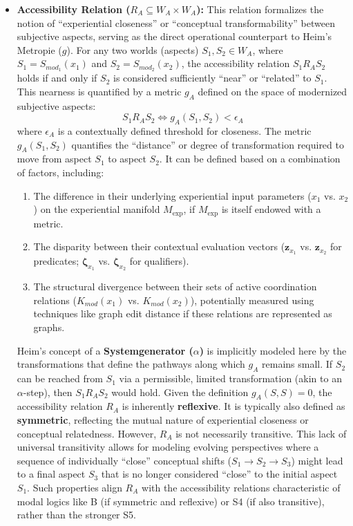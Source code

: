 \documentclass[
    12pt,              %
    a4paper,           %
    headings=normal,   %
    twoside=true,      %
    BCOR=8mm,          %
]{scrbook}
\newcommand{\q}[1]{\enquote{#1}}
\newcommand{\Mexp}{M_{\text{exp}}}
\begin{document}
\begin{itemize}
    \item   \textbf{Accessibility Relation (\(R_A \subseteq W_A \times W_A\)):} This relation formalizes the notion of \q{experiential closeness} or \q{conceptual transformability} between subjective aspects, serving as the direct operational counterpart to Heim’s Metropie (\(g\)). For any two worlds (aspects) \(S_1, S_2 \in W_A\), where \(S_1 = S_{mod_1}(x_1)\) and \(S_2 = S_{mod_2}(x_2)\), the accessibility relation \(S_1 R_A S_2\) holds if and only if \(S_2\) is considered sufficiently \q{near} or \q{related} to \(S_1\). This nearness is quantified by a metric \(g_A\) defined on the space of modernized subjective aspects:
        \[ S_1 R_A S_2 \iff g_A(S_1, S_2) < \epsilon_A \]
        where \(\epsilon_A\) is a contextually defined threshold for closeness. The metric \(g_A(S_1, S_2)\) quantifies the \q{distance} or degree of transformation required to move from aspect \(S_1\) to aspect \(S_2\). It can be defined based on a combination of factors, including:
        \begin{enumerate}[label=(\roman*)]
            \item  The difference in their underlying experiential input parameters (\(x_1\) vs. \(x_2\)) on the experiential manifold \(\Mexp\), if \(\Mexp\) is itself endowed with a metric.
            \item  The disparity between their contextual evaluation vectors (\(\mathbf{z}_{x_1}\) vs. \(\mathbf{z}_{x_2}\) for predicates; \(\mathbf{\zeta}_{x_1}\) vs. \(\mathbf{\zeta}_{x_2}\) for qualifiers).
            \item  The structural divergence between their sets of active coordination relations (\(K_{mod}(x_1)\) vs. \(K_{mod}(x_2)\)), potentially measured using techniques like graph edit distance if these relations are represented as graphs.
        \end{enumerate}
        Heim’s concept of a \textbf{Systemgenerator (\(\alpha\))} is implicitly modeled here by the transformations that define the pathways along which \(g_A\) remains small. If \(S_2\) can be reached from \(S_1\) via a permissible, limited transformation (akin to an \(\alpha\)-step), then \(S_1 R_A S_2\) would hold. Given the definition \(g_A(S,S) = 0\), the accessibility relation \(R_A\) is inherently \textbf{reflexive}. It is typically also defined as \textbf{symmetric}, reflecting the mutual nature of experiential closeness or conceptual relatedness. However, \(R_A\) is not necessarily transitive. This lack of universal transitivity allows for modeling evolving perspectives where a sequence of individually \q{close} conceptual shifts (\(S_1 \to S_2 \to S_3\)) might lead to a final aspect \(S_3\) that is no longer considered \q{close} to the initial aspect \(S_1\). Such properties align \(R_A\) with the accessibility relations characteristic of modal logics like B (if symmetric and reflexive) or S4 (if also transitive), rather than the stronger S5.


\end{itemize}
\end{document}

